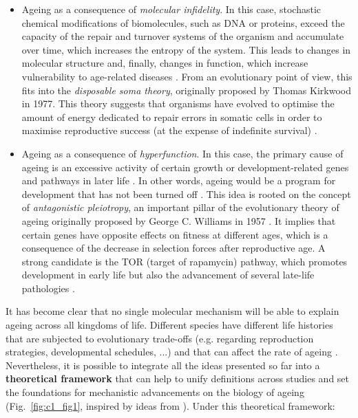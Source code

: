 \begin{itemize}
	
	\item Ageing as a consequence of \textit{molecular infidelity}. In this case, stochastic chemical modifications of biomolecules, such as DNA or proteins, exceed the capacity of the repair and turnover systems of the organism and accumulate over time, which increases the entropy of the system. This leads to changes in molecular structure and, finally, changes in function, which increase vulnerability to age-related diseases \cite{Hayflick2007,Hayflick2007a}. From an evolutionary point of view, this fits into the \textit{disposable soma theory}, originally proposed by Thomas Kirkwood in 1977. This theory suggests that organisms have evolved to optimise the amount of energy dedicated to repair errors in somatic cells in order to maximise reproductive success (at the expense of indefinite survival) \cite{Kirkwood1977,Kirkwood1991}.
	
	\item Ageing as a consequence of \textit{hyperfunction}. In this case, the primary cause of ageing is an excessive activity of certain growth or development-related genes and pathways in later life \cite{Blagosklonny2006,Blagosklonny2010,DeMagalhaes2012,Gems2015}. In other words, ageing would be a program for development that has not been turned off \cite{Blagosklonny2006}. This idea is rooted on the concept of \textit{antagonistic pleiotropy}, an important pillar of the evolutionary theory of ageing originally proposed by George C. Williams in 1957 \cite{Williams1957}. It implies that certain genes have opposite effects on fitness at different ages, which is a consequence of the decrease in selection forces after reproductive age. A strong candidate is the \acrshort{TOR} (target of rapamycin) pathway, which promotes development in early life but also the advancement of several late-life pathologies \cite{Blagosklonny2010}. 
	
\end{itemize}

It has become clear that no single molecular mechanism will be able to explain ageing across all kingdoms of life. Different species have different life histories that are subjected to evolutionary trade-offs (e.g. regarding reproduction strategies, developmental schedules, ...) and that can affect the rate of ageing \cite{Ricklefs2010,Jones2013}. Nevertheless, it is possible to integrate all the ideas presented so far into a \textbf{theoretical framework} that can help to unify definitions across studies and set the foundations for mechanistic advancements on the biology of ageing (Fig.~\ref{fig:c1_fig1}, inspired by ideas from \cite{Hayflick2007,Gems2015,Peto1997,Freund2019}). Under this theoretical framework: 

